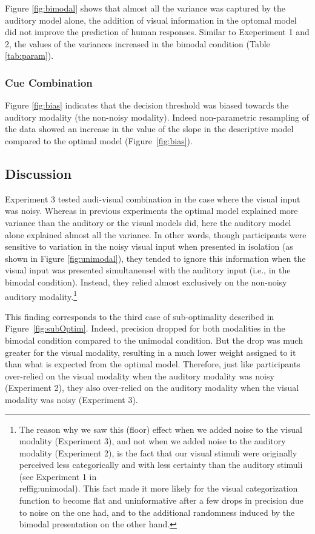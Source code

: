 \documentclass[english,,man,floatsintext]{apa6}
\let\rmarkdownfootnote\footnote%
\def\footnote{\protect\rmarkdownfootnote}
\theoremstyle{definition}
\theoremstyle{definition}
\theoremstyle{definition}
\theoremstyle{remark}
\begin{document}
Figure \ref{fig:bimodal} shows that almost all the variance was captured
by the auditory model alone, the addition of visual information in the
optomal model did not improve the prediction of human responses. Similar
to Exeperiment 1 and 2, the values of the variances increased in the
bimodal condition (Table \ref{tab:param}).

\subsubsection{Cue Combination}\label{cue-combination-2}

Figure \ref{fig:bias} indicates that the decision threshold was biased
towards the auditory modality (the non-noisy modality). Indeed
non-parametric resampling of the data showed an increase in the value of
the slope in the descriptive model compared to the optimal model
(Figure~\ref{fig:bias}).

\subsection{Discussion}\label{discussion-2}

Experiment 3 tested audi-visual combination in the case where the visual
input was noisy. Whereas in previous experiments the optimal model
explained more variance than the auditory or the visual models did, here
the auditory model alone explained almost all the variance. In other
words, though participants were sensitive to variation in the noisy
visual input when presented in isolation (as shown in Figure
\ref{fig:unimodal}), they tended to ignore this information when the
visual input was presented simultaneusel with the auditory input (i.e.,
in the bimodal condition). Instead, they relied almost exclusively on
the non-noisy auditory
modality.\footnote{The reason why we saw this (floor) effect when we added noise to the visual modality (Experiment 3), and not when we added noise to the auditory modality (Experiment 2), is the fact that our visual stimuli were originally perceived less categorically and with less certainty than the auditory stimuli (see Experiment 1 in \\ref{fig:unimodal}). This fact made it more likely for the visual categorization function to become flat and uninformative after a few drops in precision due to noise on the one had, and to the additional randomness induced by the bimodal presentation on the other hand.}

This finding corresponds to the third case of sub-optimality described
in Figure~\ref{fig:subOptim}. Indeed, precision dropped for both
modalities in the bimodal condition compared to the unimodal condition.
But the drop was much greater for the visual modality, resulting in a
much lower weight assigned to it than what is expected from the optimal
model. Therefore, just like participants over-relied on the visual
modality when the auditory modality was noisy (Experiment 2), they also
over-relied on the auditory modality when the visual modality was noisy
(Experiment 3).
\end{document}
